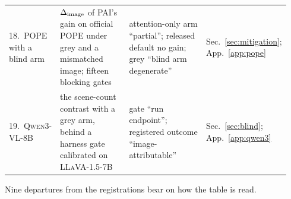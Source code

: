 \begin{table}[htbp]
\begin{center}
\begin{tabular}{@{}p{0.17\linewidth}p{0.305\linewidth}p{0.345\linewidth}p{0.12\linewidth}@{}}
\raggedright 18.\ POPE with a blind arm &
\raggedright $\Delta_{\mathrm{image}}$ of PAI's gain on official POPE under grey and a mismatched image; fifteen blocking gates &
\raggedright attention-only arm ``partial''; released default no gain; grey ``blind arm degenerate'' &
\raggedright Sec.~\ref{sec:mitigation}; App.~\ref{app:pope} \tabularnewline\addlinespace[1pt]
\raggedright 19.\ \textsc{Qwen3-VL-8B} &
\raggedright the scene-count contrast with a grey arm, behind a harness gate calibrated on \textsc{LLaVA-1.5-7B} &
\raggedright gate ``run endpoint''; registered outcome ``image-attributable'' &
\raggedright Sec.~\ref{sec:blind}; App.~\ref{app:qwen3} \tabularnewline
\bottomrule
\end{tabular}
\end{center}
\end{table}

Nine departures from the registrations bear on how the table is read.

